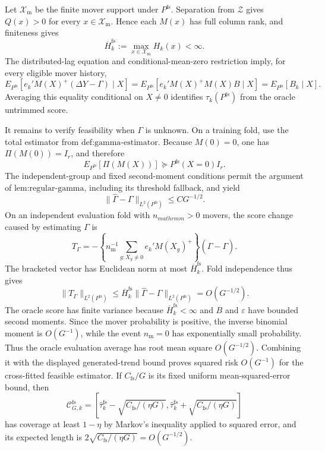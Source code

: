 Let \(\mathcal X_{\mathrm m}\) be the finite mover support under \(P^{\mathrm{fs}}\). Separation from \(\mathcal Z\) gives \(Q(x)>0\) for every \(x\in\mathcal X_{\mathrm m}\). Hence each \(M(x)\) has full column rank, and finiteness gives
\[
\overline H_k^{\mathrm{fs}}:=\max_{x\in\mathcal X_{\mathrm m}}H_k(x)<\infty.
\]
The distributed-lag equation and conditional-mean-zero restriction imply, for every eligible mover history,
\[
E_{P^{\mathrm{fs}}}[e_k'M(X)^+(\Delta Y-\Gamma)\mid X]
=E_{P^{\mathrm{fs}}}[e_k'M(X)^+M(X)B\mid X]
=E_{P^{\mathrm{fs}}}[B_k\mid X].
\]
Averaging this equality conditional on \(X\ne0\) identifies \(\tau_k(P^{\mathrm{fs}})\) from the oracle untrimmed score.

It remains to verify feasibility when \(\Gamma\) is unknown. On a training fold, use the total estimator from \(\text{def:gamma-estimator}\). Because \(M(0)=0\), one has \(\Pi(M(0))=I_r\), and therefore
\[
E_{P^{\mathrm{fs}}}[\Pi(M(X))]\succeq P^{\mathrm{fs}}(X=0)I_r.
\]
The independent-group and fixed second-moment conditions permit the argument of \(\text{lem:regular-gamma}\), including its threshold fallback, and yield
\[
\|\widehat\Gamma-\Gamma\|_{L^2(P^{\mathrm{fs}})}\le C G^{-1/2}.
\]
On an independent evaluation fold with \(n_{mathrm m}>0\) movers, the score change caused by estimating \(\Gamma\) is
\[
T_\Gamma=-\left\{n_{\mathrm m}^{-1}\sum_{g:X_g\ne0}e_k'M(X_g)^+\right\}(\widehat\Gamma-\Gamma).
\]
The bracketed vector has Euclidean norm at most \(\overline H_k^{\mathrm{fs}}\). Fold independence thus gives
\[
\|T_\Gamma\|_{L^2(P^{\mathrm{fs}})}
\le \overline H_k^{\mathrm{fs}}\|\widehat\Gamma-\Gamma\|_{L^2(P^{\mathrm{fs}})}
=O(G^{-1/2}).
\]
The oracle score has finite variance because \(\overline H_k^{\mathrm{fs}}<\infty\) and \(B\) and \(\varepsilon\) have bounded second moments. Since the mover probability is positive, the inverse binomial moment is \(O(G^{-1})\), while the event \(n_{\mathrm m}=0\) has exponentially small probability. Thus the oracle evaluation average has root mean square \(O(G^{-1/2})\). Combining it with the displayed generated-trend bound proves squared risk \(O(G^{-1})\) for the cross-fitted feasible estimator. If \(C_{\mathrm{fs}}/G\) is its fixed uniform mean-squared-error bound, then
\[
\mathcal C_{G,k}^{\mathrm{fs}}
=\left[\widehat\tau_k^{\mathrm{fs}}-\sqrt{C_{\mathrm{fs}}/(\eta G)},
\widehat\tau_k^{\mathrm{fs}}+\sqrt{C_{\mathrm{fs}}/(\eta G)}\right]
\]
has coverage at least \(1-\eta\) by Markov's inequality applied to squared error, and its expected length is \(2\sqrt{C_{\mathrm{fs}}/(\eta G)}=O(G^{-1/2})\).

